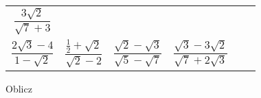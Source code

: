 \documentclass[a4paper,12pt,leqno,fleqn]{article}
\begin{document}
\begin{tabularx}{\linewidth}{@{}XX@{}XX@{}XX@{}}
\begin{equation}
    \frac{3\sqrt{2}}{\sqrt{7}+3}
  \end{equation}
\\
  \begin{equation}
    \frac{2\sqrt{3}-4}{1-\sqrt{2}}
  \end{equation}
&
  \begin{equation}
    \frac{\tfrac{1}{2}+\sqrt{2}}{\sqrt{2}-2}
  \end{equation}
&
  \begin{equation}
    \frac{\sqrt{2}-\sqrt{3}}{\sqrt{5}-\sqrt{7}}
  \end{equation}
&
  \begin{equation}
    \frac{\sqrt{3}-3\sqrt{2}}{\sqrt{7}+2\sqrt{3}}
  \end{equation}

\end{tabularx}

\newpage
Oblicz
\end{document}

